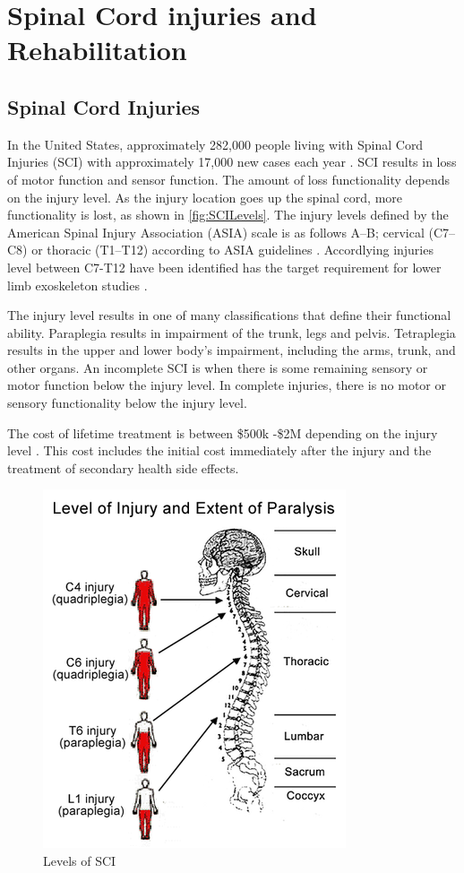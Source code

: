 \section{Spinal Cord injuries and Rehabilitation}

\subsection{Spinal Cord Injuries}
In the United States, approximately 282,000 people living with Spinal Cord Injuries (SCI) with approximately 17,000 new cases each year \cite{national2016facts}. SCI results in loss of motor function and sensor function. The amount of loss functionality depends on the injury level. As the injury location goes up the spinal cord, more functionality is lost, as shown in \autoref{fig:SCILevels}. The injury levels defined by the  American Spinal Injury Association (ASIA)  scale is as follows A–B; cervical (C7–C8) or thoracic (T1–T12) according to ASIA guidelines \cite{kirshblum2011international}. Accordlying injuries level between C7-T12 have been identified has the target requirement for lower limb exoskeleton studies \cite{esquenazi2012rewalk}. 

The injury level results in one of many classifications that define their functional ability. Paraplegia results in impairment of the trunk, legs and pelvis. Tetraplegia results in the upper and lower body's impairment, including the arms, trunk, and other organs. An incomplete SCI is when there is some remaining sensory or motor function below the injury level.  In complete injuries, there is no motor or sensory functionality below the injury level. 

The cost of lifetime treatment is between \$500k -\$2M depending on the injury level \cite{mcdonald2002spinal}. This cost includes the initial cost immediately after the injury and the treatment of secondary health side effects.  

 

\begin{figure}
    \centering
    \includegraphics[scale=0.6]{images/background/SCI.png}
    \caption[Levels of SCI]{Levels of SCI \cite{sadaka2012bradycardia}}
    \label{fig:SCILevels}
\end{figure}

